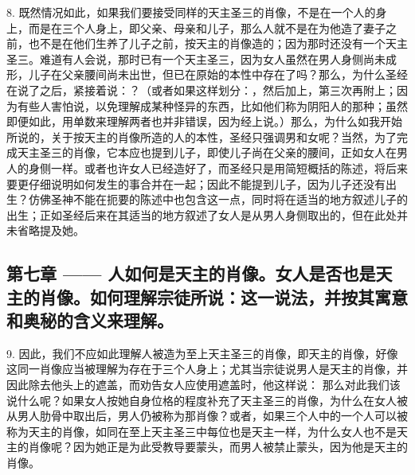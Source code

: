 8. 既然情况如此，如果我们要接受同样的天主圣三的肖像，不是在一个人的身上，而是在三个人身上，即父亲、母亲和儿子，那么人就不是在为他造了妻子之前，也不是在他们生养了儿子之前，按天主的肖像造的；因为那时还没有一个天主圣三。难道有人会说，那时已有一个天主圣三，因为女人虽然在男人身侧尚未成形，儿子在父亲腰间尚未出世，但已在原始的本性中存在了吗？那么，为什么圣经在说了之后，紧接着说：？（或者如果这样划分：，然后加上，第三次再附上；因为有些人害怕说，以免理解成某种怪异的东西，比如他们称为阴阳人的那种；虽然即便如此，用单数来理解两者也并非错误，因为经上说。）那么，为什么如我开始所说的，关于按天主的肖像所造的人的本性，圣经只强调男和女呢？当然，为了完成天主圣三的肖像，它本应也提到儿子，即使儿子尚在父亲的腰间，正如女人在男人的身侧一样。或者也许女人已经造好了，而圣经只是用简短概括的陈述，将后来要更仔细说明如何发生的事合并在一起；因此不能提到儿子，因为儿子还没有出生？仿佛圣神不能在扼要的陈述中也包含这一点，同时将在适当的地方叙述儿子的出生；正如圣经后来在其适当的地方叙述了女人是从男人身侧取出的，但在此处并未省略提及她。\par


\subsection{第七章 —— 人如何是天主的肖像。女人是否也是天主的肖像。如何理解宗徒所说：这一说法，并按其寓意和奥秘的含义来理解。}

9. 因此，我们不应如此理解人被造为至上天主圣三的肖像，即天主的肖像，好像这同一肖像应当被理解为存在于三个人身上；尤其当宗徒说男人是天主的肖像，并因此除去他头上的遮盖，而劝告女人应使用遮盖时，他这样说： 那么对此我们该说什么呢？如果女人按她自身位格的程度补充了天主圣三的肖像，为什么在女人被从男人肋骨中取出后，男人仍被称为那肖像？或者，如果三个人中的一个人可以被称为天主的肖像，如同在至上天主圣三中每位也是天主一样，为什么女人也不是天主的肖像呢？因为她正是为此受教导要蒙头，而男人被禁止蒙头，因为他是天主的肖像。\par

